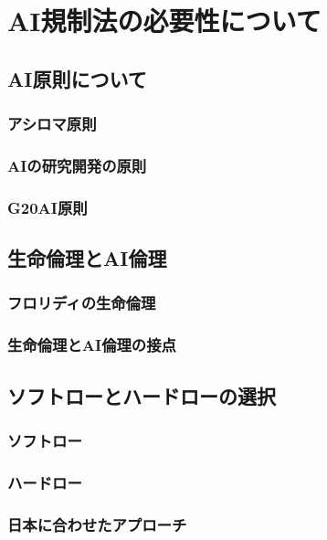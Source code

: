 \chapter{AI規制法の必要性について}

\section{AI原則について} %

\subsection{アシロマ原則} 

\subsection{AIの研究開発の原則} 

\subsection{G20AI原則}

\section{生命倫理とAI倫理} %

\subsection{フロリディの生命倫理}

\subsection{生命倫理とAI倫理の接点}

\section{ソフトローとハードローの選択} %

\subsection{ソフトロー}

\subsection{ハードロー}

\subsection{日本に合わせたアプローチ}